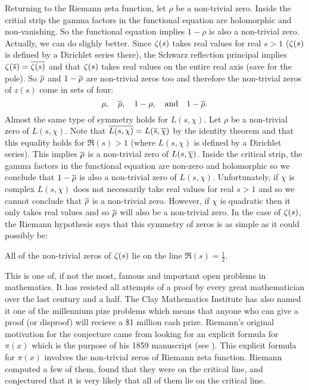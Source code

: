       Returning to the Riemann zeta function, let $\rho$ be a non-trivial zero. Inside the critial strip the gamma factors in the functional equation are holomorphic and non-vanishing. So the functional equation implies $1-\rho$ is also a non-trivial zero. Actually, we can do slighly better. Since $\zeta(s)$ takes real values for real $s > 1$ ($\zeta(s)$ is defined by a Dirichlet series there), the Schwarz reflection principal implies $\zeta(\overline{s}) = \overline{\zeta(s)}$ and that $\zeta(s)$ takes real values on the entire real axis (save for the pole). So $\overline{\rho}$ and $1-\overline{\rho}$ are non-trivial zeros too and therefore the non-trivial zeros of $z(s)$ come in sets of four:
      \[
        \rho, \quad \overline{\rho}, \quad 1-\rho, \quad \text{and} \quad 1-\overline{\rho}.
      \]
      Almost the same type of symmetry holds for $L(s,\chi)$. Let $\rho$ be a non-trivial zero of $L(s,\chi)$. Note that $\overline{L(s,\chi)} = L(\overline{s},\overline{\chi})$ by the identity theorem and that this equality holds for $\Re(s) > 1$ (where $L(s,\chi)$ is defined by a Dirichlet series). This implies $\overline{\rho}$ is a non-trivial zero of $L(s,\overline{\chi})$. Inside the critical strip, the gamma factors in the functional equation are non-zero and holomorphic so we conclude that $1-\overline{\rho}$ is also a non-trivial zero of $L(s,\chi)$. Unfortunately, if $\chi$ is complex $L(s,\chi)$ does not necessarily take real values for real $s > 1$ and so we cannot conclude that $\overline{\rho}$ is a non-trivial zero. However, if $\chi$ is quadratic then it only takes real values and so $\overline{\rho}$ will also be a non-trivial zero. In the case of $\zeta(s)$, the Riemann hypothesis says that this symmetry of zeros is as simple as it could possibly be:

      \begin{theorem}
        All of the non-trivial zeros of $\zeta(s)$ lie on the line $\Re(s) = \frac{1}{2}$.
      \end{theorem}

      This is one of, if not the most, famous and important open problems in mathematics. It has resisted all attempts of a proof by every great mathematician over the last century and a half. The Clay Mathematics Institute has also named it one of the millennium pize problems which means that anyone who can give a proof (or disproof) will recieve a \$1 million cash prize. Riemann's original motivation for the conjecture came from looking for an explicit formula for $\pi(x)$ which is the purpose of his 1859 manuscript (see \cite{riemann1859ueber}). This explicit formula for $\pi(x)$ involves the non-trivial zeros of Riemann zeta function. Riemann computed a few of them, found that they were on the critical line, and conjectured that it is very likely that all of them lie on the critical line.


